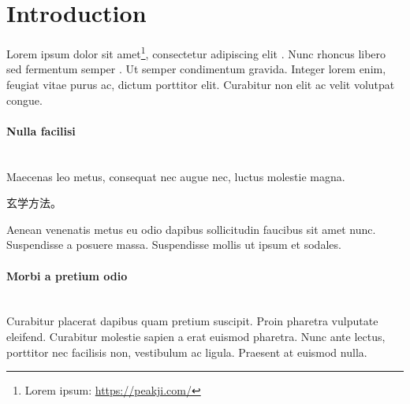 \section{Introduction}
\label{sec:intro}

Lorem ipsum dolor sit amet\footnote{Lorem ipsum: \url{https://peakji.com/}}, consectetur adipiscing elit \lorem \cite{ji1992elephant}. Nunc rhoncus libero sed fermentum semper \citet{ji2020foobar}. Ut semper condimentum gravida. Integer lorem enim, feugiat vitae purus ac, dictum porttitor elit. Curabitur non elit ac velit volutpat congue.

\paragraph{Nulla facilisi} ~\\
Maecenas leo metus, consequat nec augue nec, luctus molestie magna. \begin{CJK}{UTF8}{gbsn}玄学方法。\end{CJK} Aenean venenatis metus eu odio dapibus sollicitudin faucibus sit amet nunc. Suspendisse a posuere massa. Suspendisse mollis ut ipsum et sodales.

\paragraph{Morbi a pretium odio} ~\\
Curabitur placerat dapibus quam pretium suscipit. Proin pharetra vulputate eleifend. Curabitur molestie sapien a erat euismod pharetra. Nunc ante lectus, porttitor nec facilisis non, vestibulum ac ligula. Praesent at euismod nulla.
